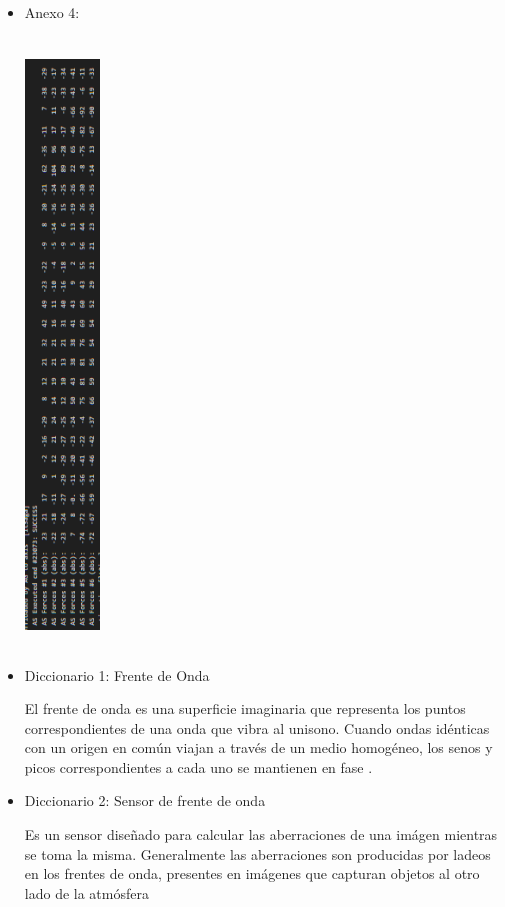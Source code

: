 \begin{itemize}
    \item Anexo 4:
        \\
        \\
        \vspace{3.5cm}
        \includegraphics[width=2cm,height=16cm]{figures/log_f_dist.png} \\
        \vspace{3.5cm}
\end{itemize}


\begin{itemize}
    \item Diccionario 1: Frente de Onda

    El frente de onda es una superficie imaginaria que representa los puntos correspondientes de una onda que vibra al unisono. Cuando ondas idénticas con un origen en común viajan a través de un medio homogéneo, los senos y picos correspondientes a cada uno se mantienen en fase \cite{britannica2022front}. 

    \item Diccionario 2: Sensor de frente de onda

    Es un sensor diseñado para calcular las aberraciones de una imágen mientras se toma la misma. Generalmente las aberraciones son producidas por ladeos en los frentes de onda, presentes en imágenes que capturan objetos al otro lado de la atmósfera \cite{platt2001sh}
\end{itemize}